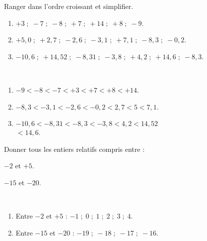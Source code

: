 \begin{colonne*exercice}
\medskip

\begin{exercice} %
   Ranger dans l'ordre croissant et simplifier.
   \begin{enumerate}
      \item $+3 \; ; \; -7 \;;\;-8 \;;\; +7 \;; \;+14\; ;\; +8 \;;\; -9$.
      \item $+5,0\; ; \;+2,7 \;;\; -2,6\; ; \;-3,1\; ; \;+7,1\; ; \;-8,3\; ;\; -0,2$.
      \item $-10,6 \;; \;+14,52\; ;\; -8,31 \;; \;-3,8 \;; \;+4,2 \;; \;+14,6\; ;\; -8,3$.
   \end{enumerate}  
\end{exercice}

\begin{corrige}
   \ \\ [-5mm]
    \begin{enumerate}
      \item \blue $-9<-8<-7<+3<+7<+8<+14$. \smallskip
      \item \blue $-8,3<-3,1<-2,6<-0,2<2,7<5<7,1$. \smallskip
      \item \blue$-10,6<-8,31<-8,3<-3,8<4,2<14,52$ \\
      \hfill $<14,6$. \smallskip
   \end{enumerate}  
\end{corrige}

\medskip

\begin{exercice} %
   Donner tous les entiers relatifs compris entre :
   \begin{colenumerate}{2}
      \item $-2$ et $+5$.
      \item $-15$ et $-20$.
   \end{colenumerate}
\end{exercice}

\begin{corrige}
   \ \\ [-5mm]
   \begin{enumerate}
      \item Entre $-2$ et $+5$ : {\blue$-1 \; ; \; 0 \; ; \; 1 \; ; \; 2 \; ; \; 3 \; ; \; 4$}. \smallskip
      \item Entre $-15$ et $-20$ : {\blue $-19 \; ; \; -18 \; ; \; -17 \; ; \; -16$}. \smallskip
   \end{enumerate}
 
\vspace*{2cm}
  

\end{corrige}
\end{colonne*exercice}
